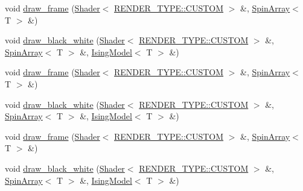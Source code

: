\begin{DoxyCompactItemize}
\item 
void \mbox{\hyperlink{classSpinArray_ac9dc81caed78947feb08a2a471e81a81}{draw\+\_\+frame}} (\mbox{\hyperlink{classShader}{Shader}}$<$ \mbox{\hyperlink{shader__class_8hpp_a24e288e18eb7b6e01de7565001fedb60a72baef04098f035e8a320b03ad197818}{R\+E\+N\+D\+E\+R\+\_\+\+T\+Y\+P\+E\+::\+C\+U\+S\+T\+OM}} $>$ \&, \mbox{\hyperlink{classSpinArray}{Spin\+Array}}$<$ T $>$ \&)
\item 
void \mbox{\hyperlink{classSpinArray_a4b62e38a6e65366bfaf2c4a4172770ad}{draw\+\_\+black\+\_\+white}} (\mbox{\hyperlink{classShader}{Shader}}$<$ \mbox{\hyperlink{shader__class_8hpp_a24e288e18eb7b6e01de7565001fedb60a72baef04098f035e8a320b03ad197818}{R\+E\+N\+D\+E\+R\+\_\+\+T\+Y\+P\+E\+::\+C\+U\+S\+T\+OM}} $>$ \&, \mbox{\hyperlink{classSpinArray}{Spin\+Array}}$<$ T $>$ \&, \mbox{\hyperlink{classIsingModel}{Ising\+Model}}$<$ T $>$ \&)
\item 
void \mbox{\hyperlink{classSpinArray_ac9dc81caed78947feb08a2a471e81a81}{draw\+\_\+frame}} (\mbox{\hyperlink{classShader}{Shader}}$<$ \mbox{\hyperlink{shader__class_8hpp_a24e288e18eb7b6e01de7565001fedb60a72baef04098f035e8a320b03ad197818}{R\+E\+N\+D\+E\+R\+\_\+\+T\+Y\+P\+E\+::\+C\+U\+S\+T\+OM}} $>$ \&, \mbox{\hyperlink{classSpinArray}{Spin\+Array}}$<$ T $>$ \&)
\item 
void \mbox{\hyperlink{classSpinArray_a4b62e38a6e65366bfaf2c4a4172770ad}{draw\+\_\+black\+\_\+white}} (\mbox{\hyperlink{classShader}{Shader}}$<$ \mbox{\hyperlink{shader__class_8hpp_a24e288e18eb7b6e01de7565001fedb60a72baef04098f035e8a320b03ad197818}{R\+E\+N\+D\+E\+R\+\_\+\+T\+Y\+P\+E\+::\+C\+U\+S\+T\+OM}} $>$ \&, \mbox{\hyperlink{classSpinArray}{Spin\+Array}}$<$ T $>$ \&, \mbox{\hyperlink{classIsingModel}{Ising\+Model}}$<$ T $>$ \&)
\item 
void \mbox{\hyperlink{classSpinArray_ac9dc81caed78947feb08a2a471e81a81}{draw\+\_\+frame}} (\mbox{\hyperlink{classShader}{Shader}}$<$ \mbox{\hyperlink{shader__class_8hpp_a24e288e18eb7b6e01de7565001fedb60a72baef04098f035e8a320b03ad197818}{R\+E\+N\+D\+E\+R\+\_\+\+T\+Y\+P\+E\+::\+C\+U\+S\+T\+OM}} $>$ \&, \mbox{\hyperlink{classSpinArray}{Spin\+Array}}$<$ T $>$ \&)
\item 
void \mbox{\hyperlink{classSpinArray_a4b62e38a6e65366bfaf2c4a4172770ad}{draw\+\_\+black\+\_\+white}} (\mbox{\hyperlink{classShader}{Shader}}$<$ \mbox{\hyperlink{shader__class_8hpp_a24e288e18eb7b6e01de7565001fedb60a72baef04098f035e8a320b03ad197818}{R\+E\+N\+D\+E\+R\+\_\+\+T\+Y\+P\+E\+::\+C\+U\+S\+T\+OM}} $>$ \&, \mbox{\hyperlink{classSpinArray}{Spin\+Array}}$<$ T $>$ \&, \mbox{\hyperlink{classIsingModel}{Ising\+Model}}$<$ T $>$ \&)
\end{DoxyCompactItemize}


